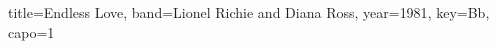 \documentclass{../../tex/bekki-leadsheet}
\begin{document}
\begin{song}[transpose-capo=true]{title={Endless Love}, band={Lionel Richie and Diana Ross}, year={1981}, key={Bb}, capo={1}}

  

\end{song}
\end{document}
